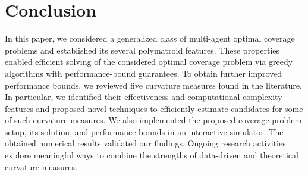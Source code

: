 \documentclass[letterpaper, 10 pt, conference]{ieeeconf}
\begin{document}









\vspace{-2mm}
\section{Conclusion}
\label{Sec:Conclusion}

In this paper, we considered a generalized class of multi-agent optimal coverage problems and established its several polymatroid features. These properties enabled efficient solving of the considered optimal coverage problem via greedy algorithms with performance-bound guarantees. To obtain further improved performance bounds, we reviewed five curvature measures found in the literature. In particular, we identified their effectiveness and computational complexity features and proposed novel techniques to efficiently estimate candidates for some of such curvature measures. We also implemented the proposed coverage problem setup, its solution, and performance bounds in an interactive simulator. The obtained numerical results validated our findings. Ongoing research activities explore meaningful ways to combine the strengths of data-driven and theoretical curvature measures.




\end{document}
